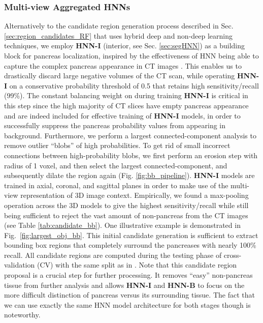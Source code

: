 \documentclass[journal]{IEEEtran}
\begin{document}
\subsubsection{Multi-view Aggregated HNNs}\label{sec:localizationHNN}
\label{sec:region_candidates} 
Alternatively to the candidate region generation process described in Sec. \ref{sec:region_candidates_RF} that uses hybrid deep and non-deep learning techniques, we employ \textbf{HNN-I} (interior, see Sec. \ref{sec:segHNN}) as a building block for pancreas localization, inspired by the effectiveness of HNN being able to capture the complex pancreas appearance in CT images \cite{roth2016spatial}. This enables us to drastically discard large negative volumes of the CT scan, while operating \textbf{HNN-I} on a conservative probability threshold of 0.5 that retains high sensitivity/recall (99\%). The constant balancing weight on  during training \textbf{HNN-I} is critical in this step since the high majority of CT slices have empty pancreas appearance and are indeed included for effective training of \textbf{HNN-I} models, in order to successfully suppress the pancreas probability values from appearing in background. 
Furthermore, we perform a largest connected-component analysis to remove outlier ``blobs'' of high probabilities. To get rid of small incorrect connections between high-probability blobs, we first perform an erosion step with radius of 1 voxel, and then select the largest connected-component, and subsequently dilate the region again (Fig. \ref{fig:bb_pipeline}). 
\textbf{HNN-I} models are trained in axial, coronal, and sagittal planes in order to make use of the multi-view representation of 3D image context. Empirically, we found a max-pooling operation across the 3D models to give the highest sensitivity/recall while still being sufficient to reject the vast amount of non-pancreas from the CT images (see Table \ref{tab:candidate_bb}). One illustrative example is demonstrated in Fig.~\ref{fig:largest_obj_bb}.
This initial candidate generation is sufficient to extract bounding box regions that completely surround the pancreases with nearly 100\% recall. All candidate regions are computed during the testing phase of cross-validation (CV) with the same split as in \cite{roth2015deeporgan}. 
Note that this candidate region proposal is a crucial step for further processing. It removes ``easy'' non-pancreas tissue from further analysis and allows \textbf{HNN-I} and \textbf{HNN-B} to focus on  the more difficult distinction of pancreas versus its surrounding tissue. The fact that we can use exactly the same HNN model architecture for both stages though is noteworthy.
\end{document}
